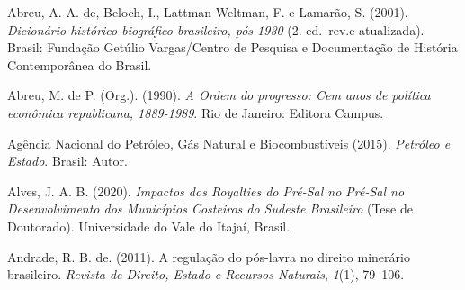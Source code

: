 \documentclass[12pt,letterpaper,oneside]{article}
\begin{document}
\begin{hangparas}{6.2mm}{1}
	Abreu, A. A. de, Beloch, I., Lattman-Weltman, F. e Lamarão, S. (2001).	\emph{Dicionário histórico-biográfico brasileiro, pós-1930} (2. ed.~rev.e atualizada). Brasil: Fundação Getúlio Vargas/Centro de Pesquisa e	Documentação de História Contemporânea do Brasil.
	
	Abreu, M. de P. (Org.). (1990). \emph{A Ordem do progresso: Cem anos de	política econômica republicana, 1889-1989}. Rio de Janeiro: Editora Campus.
	
	Agência Nacional do Petróleo, Gás Natural e Biocombustíveis (2015).	\emph{Petróleo e Estado}. Brasil: Autor. 
	
	Alves, J. A. B. (2020). \emph{Impactos dos Royalties do Pré-Sal no Pré-Sal no Desenvolvimento dos Municípios Costeiros do Sudeste	Brasileiro} (Tese de Doutorado). Universidade do Vale do Itajaí, Brasil.
	
	Andrade, R. B. de. (2011). A regulação do pós-lavra no direito minerário brasileiro. \emph{Revista de Direito, Estado e Recursos Naturais},	\emph{1}(1), 79--106.
	
\end{hangparas}
\end{document}
